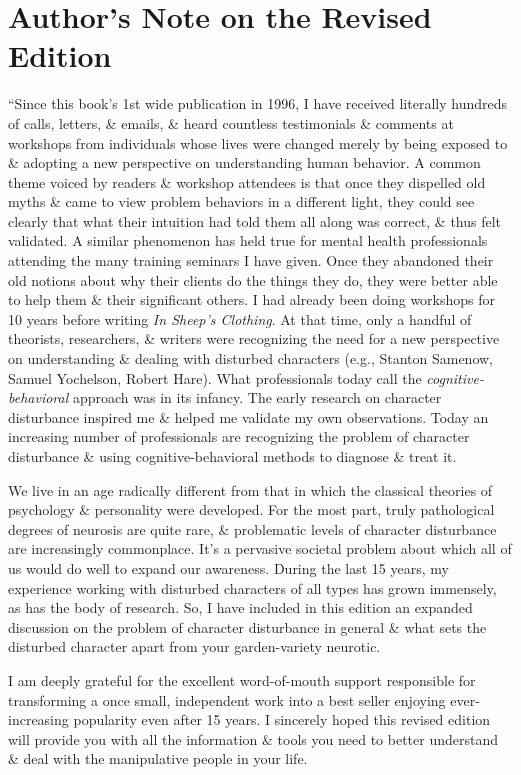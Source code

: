\documentclass{article}
\numberwithin{equation}{section}
\begin{document}
\section*{Author's Note on the Revised Edition}
``Since this book's 1st wide publication in 1996, I have received literally hundreds of calls, letters, \& emails, \& heard countless testimonials \& comments at workshops from individuals whose lives were changed merely by being exposed to \& adopting a new perspective on understanding human behavior. A common theme voiced by readers \& workshop attendees is that once they dispelled old myths \& came to view problem behaviors in a different light, they could see clearly that what their intuition had told them all along was correct, \& thus felt validated. A similar phenomenon has held true for mental health professionals attending the many training seminars I have given. Once they abandoned their old notions about why their clients do the things they do, they were better able to help them \& their significant others. I had already been doing workshops for 10 years before writing \textit{In Sheep's Clothing}. At that time, only a handful of theorists, researchers, \& writers were recognizing the need for a new perspective on understanding \& dealing with disturbed characters (e.g., Stanton Samenow, Samuel Yochelson, Robert Hare). What professionals today call the \textit{cognitive-behavioral} approach was in its infancy. The early research on character disturbance inspired me \& helped me validate my own observations. Today an increasing number of professionals are recognizing the problem of character disturbance \& using cognitive-behavioral methods to diagnose \& treat it.

We live in an age radically different from that in which the classical theories of psychology \& personality were developed. For the most part, truly pathological degrees of neurosis are quite rare, \& problematic levels of character disturbance are increasingly commonplace. It's a pervasive societal problem about which all of us would do well to expand our awareness. During the last 15 years, my experience working with disturbed characters of all types has grown immensely, as has the body of research. So, I have included in this edition an expanded discussion on the problem of character disturbance in general \& what sets the disturbed character apart from your garden-variety neurotic.

I am deeply grateful for the excellent word-of-mouth support responsible for transforming a once small, independent work into a best seller enjoying ever-increasing popularity even after 15 years. I sincerely hoped this revised edition will provide you with all the information \& tools you need to better understand \& deal with the manipulative people in your life.
\end{document}
